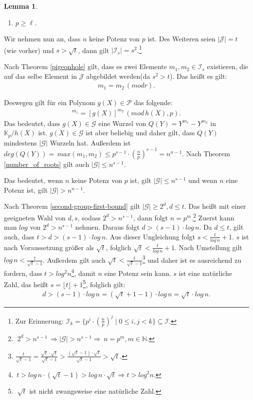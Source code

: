 \documentclass[12pt,oneside]{article}
\newtheorem{lemma}[theorem]{Lemma}
\theoremstyle{remark}
\theoremstyle{definition}
\begin{document}
\begin{flushleft}
\begin{lemma}
\begin{enumerate}
\item $p \geq \ell$.
\end{enumerate}
\end{lemma}

Wir nehmen nun an, dass $n$ keine Potenz von $p$ ist. Des Weiteren seien $|\mathcal{J}| = t$(wie vorher) und $s > \sqrt{t}$, dann gilt $|\mathcal{I}_s| = s^2$.\footnote{Zur Erinnerung: $\mathcal{I}_k= \{ p^{i} \cdot (\frac{n}{p})^j \mid 0 \leq i,j < k\} \subseteq \mathcal{I}$.}

Nach Theorem \ref{pigeonhole} gilt, dass es zwei Elemente $m_{1},m_{2} \in \mathcal{I}_s$ existieren, die auf das selbe Element in $\mathcal{J}$ abgebildet werden(da $s^2 > t $). Das heißt es gilt:
\begin{align*}
    m_{1} = m_{2} \, (mod r).
\end{align*}

Deswegen gilt für ein Polynom $g(X) \in \mathcal{P}$ das folgende:
\begin{align*}
    [g(X)]^{m_1} = [g(X)]^{m_2} \, (mod \, h(X), p).
\end{align*}
Das bedeutet, dass $g(X) \in \mathcal{G}$ eine Wurzel von $Q(Y) = Y^{m_1} - Y^{m_2}$ in $\mathbb{K}_p/h(X)$ ist. $g(X) \in \mathcal{G}$ ist aber beliebig und daher gilt, dass $Q(Y)$ mindestens $|\mathcal{G}|$ Wurzeln hat. Außerdem ist $deg (Q(Y)) = \, max(m_1,m_2) \leq p^{s - 1} \cdot (\frac{n}{p})^{s - 1} = n^{n - 1}$. Nach Theorem \ref{number_of_roots} gilt auch $|\mathcal{G}| \leq n^{s - 1}$. 

Das bedeutet, wenn $n$ keine Potenz von $p$ ist, gilt $|\mathcal{G}| \leq n^{s - 1}$ und wenn $n$ eine Potenz ist, gilt $|\mathcal{G}| > n^{n - 1}$.

Nach Theorem \ref{second-group-first-bound} gilt $|\mathcal{G}| \geq 2^d, d \leq t$. Das heißt mit einer geeigneten Wahl von $d,s$, sodass $2^d > n^{s - 1}$, dann folgt $n = p^m$.\footnote{$ \; 2^d > n^{s - 1} \, \Rightarrow |\mathcal{G}| > n^{s - 1} \Rightarrow \, n = p^m ,m \in \mathbb{N}$\cite{akalin}.} Zuerst kann man $log$ von $2^d > n^{s - 1}$ nehmen. Daraus folgt $d > (s - 1) \cdot log \, n$. Da $d \leq t$, gilt auch, dass $t > d > (s - 1) \cdot log \, n$. Aus dieser Ungleichung folgt $s < \frac{t}{log \, n} + 1$. $s$ ist nach Voraussetzung größer als $\sqrt{t}$, folglich $\sqrt{t} < \frac{t}{log \, n} + 1 $. Nach Umstellung gilt $ log \, n < \frac{t}{\sqrt{t} - 1}$. Außerdem gilt auch $\sqrt{t} <  \frac{t}{\sqrt{t} - 1}$\footnote{$\frac{t}{\sqrt{t} - 1} = \frac{\sqrt{t} \cdot \sqrt{t}}{\sqrt{t} - 1} > \frac{(\sqrt{t} - 1) \cdot \sqrt{t}}{\sqrt{t} - 1} > \sqrt{t}$.} und daher ist es ausreichend zu fordern, dass $t > log^2 n$\footnote{$\, t > log \, n \cdot (\sqrt{t} - 1) > log \, n \cdot \sqrt{t} \Rightarrow t > log^2 n$.}, damit $n$ eine Potenz sein kann. $s$ ist eine natürliche Zahl, das heißt $s = \lfloor t \rfloor + 1$\footnote{$\; \sqrt{t}$ ist nicht zwangsweise eine natürliche Zahl.}, folglich gilt:
\begin{align*}
    d > (s - 1) \cdot log \, n = (\sqrt{t} + 1 - 1) \cdot log \, n = \sqrt{t} \cdot log \, n. 
\end{align*}


\end{flushleft}
\end{document}
